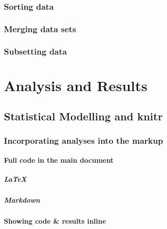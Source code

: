 \documentclass[ChapterTOCs,krantz1]{krantz}\usepackage{graphicx, color}
\begin{document}
{{\section{Sorting data}

\section{Merging data sets}

\section {Subsetting data}



\part{Analysis and Results}





\chapter{Statistical Modelling and knitr}\label{StatsModel}

\section{Incorporating analyses into the markup}

\subsection{Full code in the main document}

\subsubsection{\LaTeX  }

\subsubsection{Markdown}

\subsection{Showing code \& results inline}

}}
\end{document}
